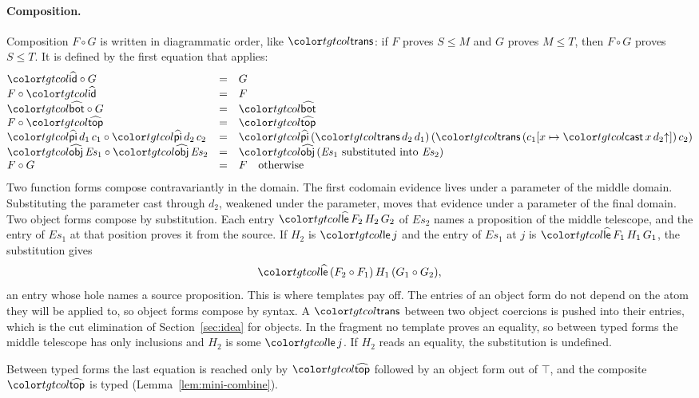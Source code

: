 \paragraph{Composition.}
Composition $F \circ G$ is written in diagrammatic order, like $\ev{trans}$: if $F$ proves $S \le M$ and $G$ proves $M \le T$, then $F \circ G$ proves $S \le T$. It is defined by the first equation that applies:
\[
\begin{array}{@{}lcl@{}}
\form{id} \circ G & = & G \\
F \circ \form{id} & = & F \\
\form{bot} \circ G & = & \form{bot} \\
F \circ \form{top} & = & \form{top} \\
\form{pi}\,d_1\,c_1 \circ \form{pi}\,d_2\,c_2 & = & \form{pi}\,(\ev{trans}\,d_2\,d_1)\,(\ev{trans}\,(c_1[x \mapsto \ev{cast}\,x\,\weak{d_2}])\,c_2) \\
\form{obj}\,\mathit{Es}_1 \circ \form{obj}\,\mathit{Es}_2 & = & \form{obj}\,(\mathit{Es}_1 \text{ substituted into } \mathit{Es}_2) \\
F \circ G & = & F \quad \text{otherwise}
\end{array}
\]
Two function forms compose contravariantly in the domain. The first codomain evidence lives under a parameter of the middle domain. Substituting the parameter cast through $d_2$, weakened under the parameter, moves that evidence under a parameter of the final domain. Two object forms compose by substitution. Each entry $\form{le}\,F_2\,H_2\,G_2$ of $\mathit{Es}_2$ names a proposition of the middle telescope, and the entry of $\mathit{Es}_1$ at that position proves it from the source. If $H_2$ is $\ev{le}\,j$ and the entry of $\mathit{Es}_1$ at $j$ is $\form{le}\,F_1\,H_1\,G_1$, the substitution gives
\[
\form{le}\,(F_2 \circ F_1)\,H_1\,(G_1 \circ G_2) ,
\]
an entry whose hole names a source proposition. This is where templates pay off. The entries of an object form do not depend on the atom they will be applied to, so object forms compose by syntax. A $\ev{trans}$ between two object coercions is pushed into their entries, which is the cut elimination of Section~\ref{sec:idea} for objects. In the fragment no template proves an equality, so between typed forms the middle telescope has only inclusions and $H_2$ is some $\ev{le}\,j$. If $H_2$ reads an equality, the substitution is undefined.

Between typed forms the last equation is reached only by $\form{top}$ followed by an object form out of $\top$, and the composite $\form{top}$ is typed (Lemma~\ref{lem:mini-combine}).

